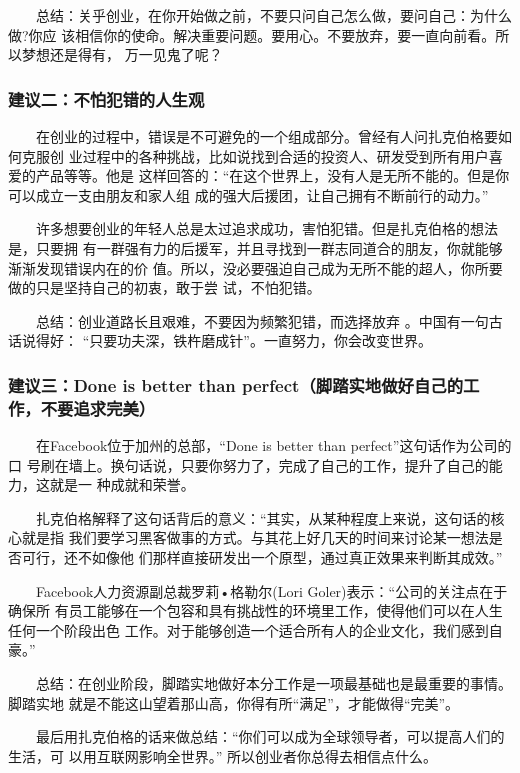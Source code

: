 \documentclass[11pt]{ctexart}
\begin{document}
　　总结：关乎创业，在你开始做之前，不要只问自己怎么做，要问自己：为什么做?你应
该相信你的使命。解决重要问题。要用心。不要放弃，要一直向前看。所以梦想还是得有，
万一见鬼了呢？


\subsubsection{建议二：不怕犯错的人生观}
\label{sec:orgheadline53}
　　在创业的过程中，错误是不可避免的一个组成部分。曾经有人问扎克伯格要如何克服创
业过程中的各种挑战，比如说找到合适的投资人、研发受到所有用户喜爱的产品等等。他是
这样回答的：“在这个世界上，没有人是无所不能的。但是你可以成立一支由朋友和家人组
成的强大后援团，让自己拥有不断前行的动力。”


　　许多想要创业的年轻人总是太过追求成功，害怕犯错。但是扎克伯格的想法是，只要拥
有一群强有力的后援军，并且寻找到一群志同道合的朋友，你就能够渐渐发现错误内在的价
值。所以，没必要强迫自己成为无所不能的超人，你所要做的只是坚持自己的初衷，敢于尝
试，不怕犯错。


　　总结：创业道路长且艰难，不要因为频繁犯错，而选择放弃 。中国有一句古话说得好：
“只要功夫深，铁杵磨成针”。一直努力，你会改变世界。


\subsubsection{建议三：Done is better than perfect（脚踏实地做好自己的工作，不要追求完美）}
\label{sec:orgheadline54}
　　在Facebook位于加州的总部，“Done is better than perfect”这句话作为公司的口
号刷在墙上。换句话说，只要你努力了，完成了自己的工作，提升了自己的能力，这就是一
种成就和荣誉。


　　扎克伯格解释了这句话背后的意义：“其实，从某种程度上来说，这句话的核心就是指
我们要学习黑客做事的方式。与其花上好几天的时间来讨论某一想法是否可行，还不如像他
们那样直接研发出一个原型，通过真正效果来判断其成效。”


　　Facebook人力资源副总裁罗莉•格勒尔(Lori Goler)表示：“公司的关注点在于确保所
有员工能够在一个包容和具有挑战性的环境里工作，使得他们可以在人生任何一个阶段出色
工作。对于能够创造一个适合所有人的企业文化，我们感到自豪。”


　　总结：在创业阶段，脚踏实地做好本分工作是一项最基础也是最重要的事情。脚踏实地
就是不能这山望着那山高，你得有所“满足”，才能做得“完美”。


　　最后用扎克伯格的话来做总结：“你们可以成为全球领导者，可以提高人们的生活，可
以用互联网影响全世界。” 所以创业者你总得去相信点什么。
\end{document}
